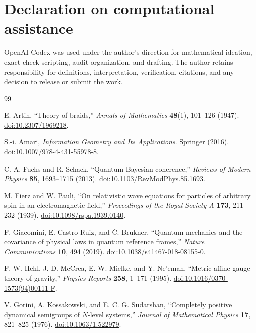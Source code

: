 \documentclass[11pt]{article}
\theoremstyle{definition}
\theoremstyle{remark}
\begin{document}
\section*{Declaration on computational assistance}

OpenAI Codex was used under the author's direction for mathematical ideation, exact-check scripting, audit organization, and drafting. The author retains responsibility for definitions, interpretation, verification, citations, and any decision to release or submit the work.

\begin{thebibliography}{99}
\raggedright
\small

E. Artin, ``Theory of braids,'' \emph{Annals of Mathematics} \textbf{48}(1), 101--126 (1947). \href{https://doi.org/10.2307/1969218}{doi:10.2307/1969218}.

S.-i. Amari, \emph{Information Geometry and Its Applications}. Springer (2016). \href{https://doi.org/10.1007/978-4-431-55978-8}{doi:10.1007/978-4-431-55978-8}.

C. A. Fuchs and R. Schack, ``Quantum-Bayesian coherence,'' \emph{Reviews of Modern Physics} \textbf{85}, 1693--1715 (2013). \href{https://doi.org/10.1103/RevModPhys.85.1693}{doi:10.1103/RevModPhys.85.1693}.

M. Fierz and W. Pauli, ``On relativistic wave equations for particles of arbitrary spin in an electromagnetic field,'' \emph{Proceedings of the Royal Society A} \textbf{173}, 211--232 (1939). \href{https://doi.org/10.1098/rspa.1939.0140}{doi:10.1098/rspa.1939.0140}.

F. Giacomini, E. Castro-Ruiz, and \v{C}. Brukner, ``Quantum mechanics and the covariance of physical laws in quantum reference frames,'' \emph{Nature Communications} \textbf{10}, 494 (2019). \href{https://doi.org/10.1038/s41467-018-08155-0}{doi:10.1038/s41467-018-08155-0}.

F. W. Hehl, J. D. McCrea, E. W. Mielke, and Y. Ne'eman, ``Metric-affine gauge theory of gravity,'' \emph{Physics Reports} \textbf{258}, 1--171 (1995). \href{https://doi.org/10.1016/0370-1573(94)00111-F}{doi:10.1016/0370-1573(94)00111-F}.

V. Gorini, A. Kossakowski, and E. C. G. Sudarshan, ``Completely positive dynamical semigroups of $N$-level systems,'' \emph{Journal of Mathematical Physics} \textbf{17}, 821--825 (1976). \href{https://doi.org/10.1063/1.522979}{doi:10.1063/1.522979}.


\end{thebibliography}
\end{document}
